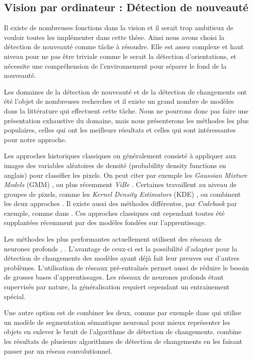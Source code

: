 \subsection{Vision par ordinateur : Détection de nouveauté}

	Il existe de nombreuses fonctions dans la vision et il serait trop ambitieux de vouloir toutes les implémenter dans cette thèse. Ainsi nous avons choisi la détection de nouveauté comme tâche à résoudre. Elle est assez complexe et haut niveau pour ne pas être triviale comme le serait la détection d'orientations, et nécessite une compréhension de l'environnement pour séparer le fond de la nouveauté. 

	Les domaines de la détection de nouveauté et de la détection de changements ont été l'objet de nombreuses recherches et il existe un grand nombre de modèles dans la littérature qui effectuent cette tâche. Nous ne pourrons donc pas faire une présentation exhaustive du domaine, mais nous présenterons les méthodes les plus populaires, celles qui ont les meilleurs résultats et celles qui sont intéressantes pour notre approche.

	Les approches historiques classiques on généralement consisté à appliquer aux images des variables aléatoires de densité (probability density functions en anglais) pour classifier les pixels. On peut citer par exemple les \textit{Gaussian Mixture Models} (GMM) \cite{zivkovic2004improved}, ou plus récemment \textit{ViBe} \cite{barnich2009vibe}. Certaines travaillent au niveau de groupes de pixels, comme les \textit{Kernel Density Estimators} (KDE) \cite{elgammal2000non}, ou combinent les deux approches \cite{toyama1999wallflower}. Il existe aussi des méthodes différentes, par \textit{Codebook} par exemple, comme dans \cite{kim2004background}. Ces approches classiques ont cependant toutes été supplantées récemment par des modèles fondées sur l'apprentissage.

	Les méthodes les plus performantes actuellement utilisent des réseaux de neurones profonds \cite{tezcan2021bsuv}, \cite{bouwmans2019deep}. L'avantage de ceux-ci est la possibilité d'adapter pour la détection de changements des modèles ayant déjà fait leur preuves sur d'autres problèmes. L'utilisation de réseaux pré-entraînés permet aussi de réduire le besoin de grosses bases d'apprentissages. Les réseaux de neurones profonds étant supervisés par nature, la généralisation requiert cependant un entrainement spécial.

	Une autre option est de combiner les deux, comme par exemple dans \cite{braham2017semantic} qui utilise un modèle de segmentation sémantique neuronal pour mieux représenter les objets en enlever le bruit de l'algorithme de détection de changements. \cite{zeng2019combining} combine les résultats de plusieurs algorithmes de détection de changements en les faisant passer par un réseau convolutionnel.

